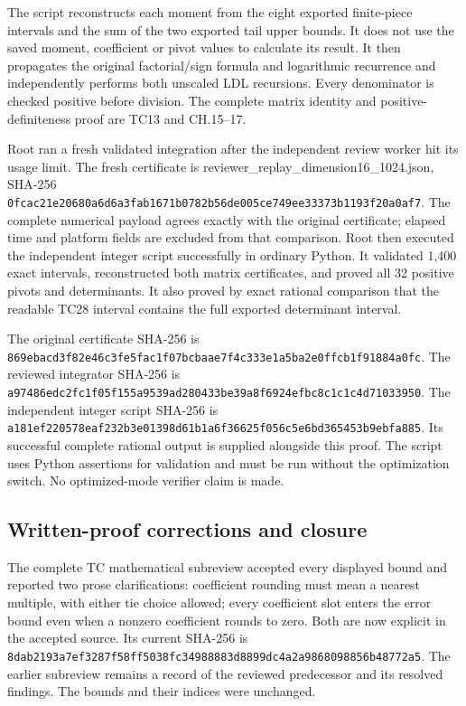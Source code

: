 The script reconstructs each moment from the eight exported finite-piece intervals and the sum of the two exported tail upper bounds. It does not use the saved moment, coefficient or pivot values to calculate its result. It then propagates the original factorial/sign formula and logarithmic recurrence and independently performs both unscaled LDL recursions. Every denominator is checked positive before division. The complete matrix identity and positive-definiteness proof are TC13 and CH.15--17.

Root ran a fresh validated integration after the independent review worker hit its usage limit. The fresh certificate is reviewer\_replay\_dimension16\_1024.json, SHA-256 \nolinkurl{0fcac21e20680a6d6a3fab1671b0782b56de005ce749ee33373b1193f20a0af7}. The complete numerical payload agrees exactly with the original certificate; elapsed time and platform fields are excluded from that comparison. Root then executed the independent integer script successfully in ordinary Python. It validated 1,400 exact intervals, reconstructed both matrix certificates, and proved all 32 positive pivots and determinants. It also proved by exact rational comparison that the readable TC28 interval contains the full exported determinant interval.

The original certificate SHA-256 is \nolinkurl{869ebacd3f82e46c3fe5fac1f07bcbaae7f4c333e1a5ba2e0ffcb1f91884a0fc}. The reviewed integrator SHA-256 is \nolinkurl{a97486edc2fc1f05f155a9539ad280433be39a8f6924efbc8c1c1c4d71033950}. The independent integer script SHA-256 is \nolinkurl{a181ef220578eaf232b3e01398d61b1a6f36625f056c5e6bd365453b9ebfa885}. Its successful complete rational output is supplied alongside this proof. The script uses Python assertions for validation and must be run without the optimization switch. No optimized-mode verifier claim is made.

\subsection{Written-proof corrections and closure}\label{written-proof-corrections-and-closure}

The complete TC mathematical subreview accepted every displayed bound and reported two prose clarifications: coefficient rounding must mean a nearest multiple, with either tie choice allowed; every coefficient slot enters the error bound even when a nonzero coefficient rounds to zero. Both are now explicit in the accepted source. Its current SHA-256 is \nolinkurl{8dab2193a7ef3287f58ff5038fc34988883d8899dc4a2a9868098856b48772a5}. The earlier subreview remains a record of the reviewed predecessor and its resolved findings. The bounds and their indices were unchanged.

